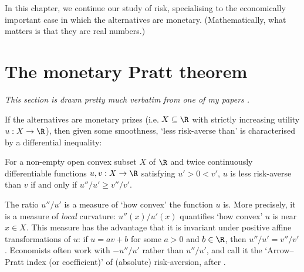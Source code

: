 





In this chapter, we continue our study of risk, specialising to the economically important case in which the alternatives are monetary. (Mathematically, what matters is that they are real numbers.)



\section{The monetary Pratt theorem}
\label{mone:pratt_money}

\emph{This section is drawn pretty much verbatim from one of my papers \parencite{oo}.}

If the alternatives are monetary prizes (i.e. $X \subseteq \R$ with strictly increasing utility $u : X \to \R$), then given some smoothness, `less risk-averse than' is characterised by a differential inequality:

\begin{namedthm}
	\label{theorem:pratt_diff}
	For a non-empty open convex subset $X$ of $\R$ and twice continuously differentiable functions $u,v : X \to \R$ satisfying $u' > 0 < v'$, $u$ is less risk-averse than $v$ if and only if $u''/u' \geq v''/v'$.
\end{namedthm}

The ratio $u''/u'$ is a measure of `how convex' the function $u$ is. More precisely, it is a measure of \emph{local} curvature: $u''(x)/u'(x)$ quantifies `how convex' $u$ is near $x \in X$. This measure has the advantage that it is invariant under positive affine transformations of $u$: if $u = av+b$ for some $a>0$ and $b \in \R$, then $u''/u' = v''/v'$. Economists often work with $-u''/u'$ rather than $u''/u'$, and call it the `Arrow--Pratt index (or coefficient)' of (absolute) risk-aversion, after \textcite{Arrow1965,Pratt1964}.

